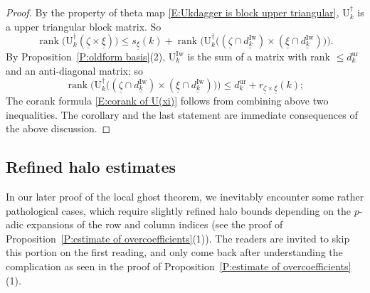 \documentclass[12pt]{amsart}
\theoremstyle{definition}
\numberwithin{equation}{subsection}
\def\rmU{\mathrm{U}}
\DeclareMathOperator{\rank}{rank}
\newcommand{\Iw}{\mathrm{Iw}}
\newcommand{\ur}{\mathrm{ur}}
\begin{document}
\begin{proof}
By the property of theta map \eqref{E:Ukdagger is block upper triangular}, $\rmU^\dagger_k$ is a upper triangular block matrix. So
$$
\rank \big(\rmU^\dagger_k(\underline \zeta \times \underline \xi) \big)\leq s_{\underline \xi}(k) + \rank\big( \rmU^\dagger_k\big((\underline \zeta\cap \underline{d_k^\Iw}) \times (\underline \xi\cap \underline{d_k^\Iw})\big) \big).
$$
By Proposition~\ref{P:oldform basis}(2), $\rmU^{\Iw}_k$ is the sum of a matrix with rank $\leq d_k^\ur$ and an anti-diagonal matrix; so
$$
\rank\big( \rmU^\dagger_k\big((\underline \zeta\cap \underline{d_k^\Iw}) \times (\underline \xi\cap \underline{d_k^\Iw})\big) \big) \leq d_k^\ur + r_{\underline \zeta \times \underline \xi}(k);
$$
The corank formula \eqref{E:corank of U(xi)} follows from combining above two inequalities.
The corollary and the last statement are immediate consequences of the above discussion.
\end{proof}



\subsection{Refined halo estimates}
\label{SS:Mahler estimate finer} 
In our later proof of the local ghost theorem, we inevitably encounter some rather pathological cases, which require slightly refined halo bounds depending on the $p$-adic expansions of the row and column indices (see the proof of Proposition~\ref{P:estimate of overcoefficients}(1)). The readers are invited to skip this portion on the first reading, and only come back after understanding the complication as seen in the proof of Proposition~\ref{P:estimate of overcoefficients}(1).
\end{document}
